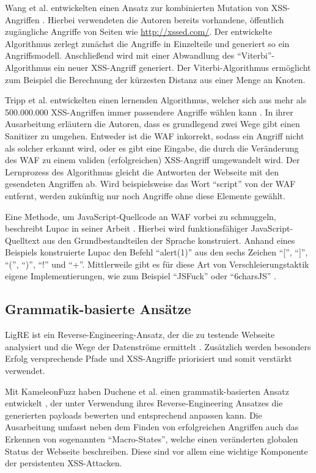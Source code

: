 Wang et al. entwickelten einen Ansatz zur kombinierten Mutation von \ac{XSS}-Angriffen \cite{Wang2010}. Hierbei verwendeten die Autoren bereits vorhandene, öffentlich zugängliche Angriffe von Seiten wie \url{http://xssed.com/}. Der entwickelte Algorithmus zerlegt zunächst die Angriffe in Einzelteile und generiert so ein Angriffsmodell. Anschließend wird mit einer Abwandlung des ``Viterbi''-Algorithmus \cite{Viterbi1967} ein neuer \ac{XSS}-Angriff generiert. Der Viterbi-Algorithmus ermöglicht zum Beispiel die Berechnung der kürzesten Distanz aus einer Menge an Knoten.

Tripp et al. entwickelten einen lernenden Algorithmus, welcher sich aus mehr als 500.000.000 \ac{XSS}-Angriffen immer passendere Angriffe wählen kann \cite{Tripp2013}. In ihrer Ausarbeitung erläutern die Autoren, dass es grundlegend zwei Wege gibt einen \gls{Sanitizer} zu umgehen. Entweder ist die WAF inkorrekt, sodass ein Angriff nicht als solcher erkannt wird, oder es gibt eine Eingabe, die durch die Veränderung des WAF zu einem validen (erfolgreichen) \ac{XSS}-Angriff umgewandelt wird. Der Lernprozess des Algorithmus gleicht die Antworten der Webseite mit den gesendeten Angriffen ab. Wird beispielsweise das Wort ``script'' von der WAF entfernt, werden zukünftig nur noch Angriffe ohne diese Elemente gewählt.

Eine Methode, um JavaScript-Quellcode an \ac{WAF} vorbei zu schmuggeln, beschreibt Lupac in seiner Arbeit \cite{Luptak2011}. Hierbei wird funktionsfähiger JavaScript-Quelltext aus den Grundbestandteilen der Sprache konstruiert. Anhand eines Beispiels konstruierte Lupac den Befehl ``alert(1)'' aus den sechs Zeichen ``['', ``]'', ``('', ``)'', ``!'' und ``+''. Mittlerweile gibt es für diese Art von Verschleierungstaktik eigene Implementierungen, wie zum Beispiel ``JSFuck'' \cite{Kleppe} oder ``6charsJS'' \cite{Pollet-Villard2016}.

\subsection{Grammatik-basierte Ansätze}\label{ssec:grammar-based-approaches}

LigRE ist ein Reverse-Engineering-Ansatz, der die zu testende Webseite analysiert und die Wege der Datenströme ermittelt \cite{Duchene2013}. Zusätzlich werden besonders Erfolg versprechende Pfade und \ac{XSS}-Angriffe priorisiert und somit verstärkt verwendet.

Mit KameleonFuzz haben Duchene et al. einen grammatik-basierten Ansatz entwickelt \cite{Duchene2014}, der unter Verwendung ihres Reverse-Engineering Ansatzes die generierten \gls{payload}s bewerten und entsprechend anpassen kann. Die Ausarbeitung umfasst neben dem Finden von erfolgreichen Angriffen auch das Erkennen von sogenannten ``Macro-States'', welche einen veränderten globalen Status der Webseite beschreiben. Diese sind vor allem eine wichtige Komponente der persistenten \acl{XSS}-Attacken.

